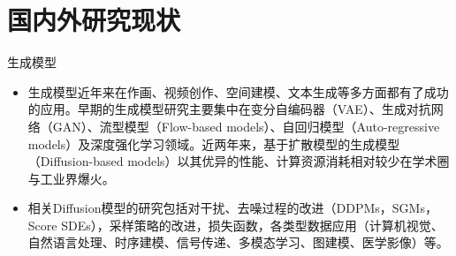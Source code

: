 \documentclass{beamer}
\begin{document}


\section{国内外研究现状}
\begin{frame}{生成模型}
    \begin{itemize}
        \item 生成模型近年来在作画、视频创作、空间建模、文本生成等多方面都有了成功的应用。早期的生成模型研究主要集中在变分自编码器（VAE）、生成对抗网络（GAN）、流型模型（Flow-based models）、自回归模型（Auto-regressive models）及深度强化学习领域。近两年来，基于扩散模型的生成模型（Diffusion-based models）以其优异的性能、计算资源消耗相对较少在学术圈与工业界爆火。
        \item 相关Diffusion模型的研究包括对干扰、去噪过程的改进（DDPMs，SGMs，Score SDEs），采样策略的改进，损失函数，各类型数据应用（计算机视觉、自然语言处理、时序建模、信号传递、多模态学习、图建模、医学影像）等。
    \end{itemize}
\end{frame}
\end{document}
